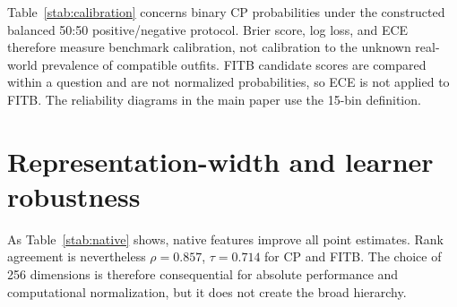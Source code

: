 \documentclass[pdflatex,sn-mathphys-num,iicol]{sn-jnl}
\begin{document}
Table~\ref{stab:calibration} concerns binary CP probabilities under the constructed balanced 50:50 positive/negative protocol. Brier score, log loss, and ECE therefore measure benchmark calibration, not calibration to the unknown real-world prevalence of compatible outfits. FITB candidate scores are compared within a question and are not normalized probabilities, so ECE is not applied to FITB. The reliability diagrams in the main paper use the 15-bin definition.

\section{Representation-width and learner robustness}

\begin{table}[t]
\caption{IQON PCA-256 versus native-dimensional features. Every native-width setting repeats train-only scaling and validation selection.}
\label{stab:native}
\centering\small
{}
\end{table}

As Table~\ref{stab:native} shows, native features improve all point estimates. Rank agreement is nevertheless $\rho=0.857$, $\tau=0.714$ for CP and FITB. The choice of 256 dimensions is therefore consequential for absolute performance and computational normalization, but it does not create the broad hierarchy.
\end{document}
